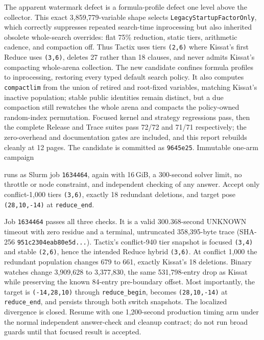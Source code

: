 \documentclass[11pt]{article}
\newcommand{\code}[1]{\texttt{#1}}
\newcommand{\artifact}[1]{\path{#1}}
\begin{document}
The apparent watermark defect is a formula-profile defect one level above the
collector. This exact 3,859,779-variable shape selects
\code{LegacyStartupFactorOnly}, which correctly suppresses repeated
search-time inprocessing but also inherited obsolete whole-search overrides:
flat 75\% reduction, static tiers, arithmetic cadence, and compaction off.
Thus Tactix uses tiers \code{(2,6)} where Kissat's first Reduce uses
\code{(3,6)}, deletes 27 rather than 18 clauses, and never admits Kissat's
compacting whole-arena collection. The new candidate confines formula profiles
to inprocessing, restoring every typed default search policy. It also computes
\code{compactlim} from the union of retired and root-fixed variables, matching
Kissat's inactive population; stable public identities remain distinct, but a
due compaction still rewatches the whole arena and compacts the policy-owned
random-index permutation. Focused kernel and strategy regressions pass, then
the complete Release and Trace suites pass 72/72 and 71/71 respectively; the
zero-overhead and documentation gates are included, and this report rebuilds
cleanly at 12 pages. The candidate is committed as \code{9645e25}. Immutable
one-arm campaign
\begin{center}\small\artifact{20260819-0437-tierd-rank22-profile-search-defaults}\end{center}
runs as Slurm job \code{1634464}, again with 16\,GiB, a 300-second solver
limit, no throttle or node constraint, and independent checking of any answer.
Accept only conflict-1,000 tiers \code{(3,6)}, exactly 18 redundant deletions,
and target pose \code{(28,10,-14)} at \code{reduce\_end}.

Job \code{1634464} passes all three checks. It is a valid 300.368-second
UNKNOWN timeout with zero residue and a terminal, untruncated 358,395-byte
trace (SHA-256 \code{951c2304eab80e5d...}). Tactix's conflict-940 tier
snapshot is focused \code{(3,4)} and stable \code{(2,6)}, hence the intended
Reduce hybrid \code{(3,6)}. At conflict 1,000 the redundant population changes
679 to 661, exactly Kissat's 18 deletions. Binary watches change 3,909,628 to
3,377,830, the same 531,798-entry drop as Kissat while preserving the known
84-entry pre-boundary offset. Most importantly, the target is
\code{(-14,28,10)} through \code{reduce\_begin}, becomes
\code{(28,10,-14)} at \code{reduce\_end}, and persists through both switch
snapshots. The localized divergence is closed. Resume with one 1,200-second
production timing arm under the normal independent answer-check and cleanup
contract; do not run broad guards until that focused result is accepted.
\end{document}

